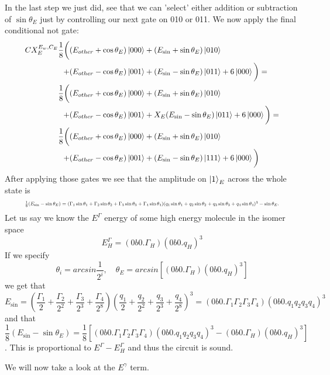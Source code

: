 \noindent
In the last step we just did, see that we can 'select' either addition or subtraction of $\sin\theta_E$ just by controlling our next gate on 010 or 011. 
We now apply the final conditional not gate:
\begin{equation}
   \resizebox{.9\hsize}{!}{$\begin{split}
        CX_{E}^{E_w,C_E}\frac{1}{8}\bigg(
        &(E_{other}+\cos\theta_E)\ket{000}+(E_{\sin}+\sin\theta_E)\ket{010}\\+
        &(E_{other}-\cos\theta_E)\ket{001}+(E_{\sin}-\sin\theta_E)\ket{011}+6\ket{000}\bigg)=\\
        \frac{1}{8}\bigg(
        &(E_{other}+\cos\theta_E)\ket{000}+(E_{\sin}+\sin\theta_E)\ket{010}\\+
        &(E_{other}-\cos\theta_E)\ket{001}+X_{E}(E_{\sin}-\sin\theta_E)\ket{011}+6\ket{000}\bigg)=\\
        \frac{1}{8}\bigg(
        &(E_{other}+\cos\theta_E)\ket{000}+(E_{\sin}+\sin\theta_E)\ket{010}\\+
        &(E_{other}-\cos\theta_E)\ket{001}+(E_{\sin}-\sin\theta_E)\ket{111}+6\ket{000}\bigg)\\
   \end{split}$}
\end{equation}
After applying those gates we see that the amplitude on $\ket{1}_{E}$ across the whole state is 
\begin{equation*}
   \resizebox{.9\hsize}{!}{$\frac{1}{8}(E_{\sin}-\sin\theta_E)=(\Gamma_1\sin\theta_1+\Gamma_2\sin\theta_2+\Gamma_3\sin\theta_3+\Gamma_4\sin\theta_4)(q_1\sin\theta_1+q_2\sin\theta_2+q_3\sin\theta_3+q_4\sin\theta_4)^3-\sin\theta_E.$}
\end{equation*}
Let us say we know the $E^\Gamma$ energy of some high energy molecule in the isomer space $$E^\Gamma_H = (0b0.\Gamma_H)(0b0.q_H)^3$$
If we specify 
$$\theta_i=arcsin\frac{1}{2^i},\quad\theta_E=arcsin[(0b0.\Gamma_H)(0b0.q_H)^3]$$ 
we get that $$E_{\sin}=(\frac{\Gamma_1}{2}+\frac{\Gamma_2}{2^2}+\frac{\Gamma_3}{2^3}+\frac{\Gamma_4}{2^8})(\frac{q_1}{2}+\frac{q_2}{2^2}+\frac{q_3}{2^3}+\frac{q_4}{2^8})^3=(0b0.\Gamma_1\Gamma_2\Gamma_3\Gamma_4)(0b0.q_1q_2q_3q_4)^3$$ and that $$\frac{1}{8}(E_{\sin}-\sin\theta_E)=\frac{1}{8}[(0b0.\Gamma_1\Gamma_2\Gamma_3\Gamma_4)(0b0.q_1q_2q_3q_4)^3-(0b0.\Gamma_H)(0b0.q_H)^3]$$. This is proportional to $E^\Gamma-E^\Gamma_H$ and thus the circuit is sound. 

We will now take a look at the $E^\gamma$ term.

